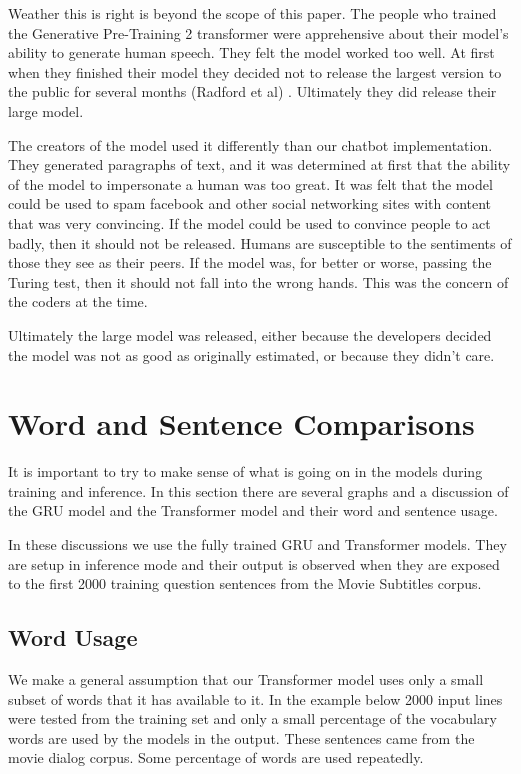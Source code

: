 Weather this is right is beyond the scope of this paper. The people who trained the Generative Pre-Training 2 transformer were apprehensive about their model's ability to generate human speech. They felt the model worked too well. At first when they finished their model they decided not to release the largest version to the public for several months (Radford et al) \cite{radford2019language}. Ultimately they did release their large model.

The creators of the model used it differently than our chatbot implementation. They generated paragraphs of text, and it was determined at first that the ability of the model to impersonate a human was too great. It was felt that the model could be used to spam facebook and other social networking sites with content that was very convincing. If the model could be used to convince people to act badly, then it should not be released. Humans are susceptible to the sentiments of those they see as their peers. If the model was, for better or worse, passing the Turing test, then it should not fall into the wrong hands. This was the concern of the coders at the time.

Ultimately the large model was released, either because the developers decided the model was not as good as originally estimated, or because they didn't care. 

\section{Word and Sentence Comparisons}

It is important to try to make sense of what is going on in the models during training and inference. In this section there are several graphs and a discussion of the GRU model and the Transformer model and their word and sentence usage.

In these discussions we use the fully trained GRU and Transformer models. They are setup in inference mode and their output is observed when they are exposed to the first 2000 training question sentences from the Movie Subtitles corpus.

\subsection{Word Usage}

We make a general assumption that our Transformer model uses only a small subset of words that it has available to it. In the example below 2000 input lines were tested from the training set and only a small percentage of the vocabulary words are used by the models in the output. These sentences came from the movie dialog corpus. Some percentage of words are used repeatedly.

